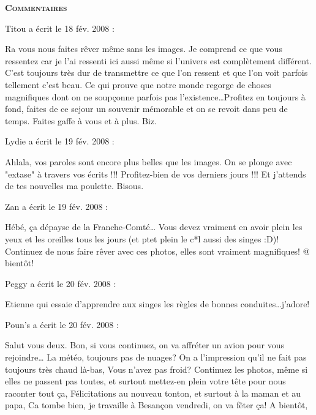 \bigskip
\textbf{\textsc{Commentaires}}

\medskip
Titou a écrit le 18 fév. 2008 :
\begin{displayquote}
Ra vous nous faites rêver même sans les images. Je comprend ce que vous ressentez car je l'ai ressenti ici aussi même si l'univers est complètement différent. C'est toujours très dur de transmettre ce que l'on ressent et que l'on voit parfois tellement c'est beau. Ce qui prouve que notre monde regorge de choses magnifiques dont on ne soupçonne parfois pas l'existence\dots Profitez en toujours à fond, faites de ce sejour un souvenir mémorable et on se revoit dans peu de temps. Faites gaffe à vous et à plus. Biz.
\end{displayquote}

\medskip
Lydie a écrit le 19 fév. 2008 :
\begin{displayquote}
Ahlala, vos paroles sont encore plus belles que les images. On se plonge avec "extase" à travers vos écrits !!!
Profitez-bien de vos derniers jours !!! Et j'attends de tes nouvelles ma poulette. Bisous.
\end{displayquote}

\medskip
Zan a écrit le 19 fév. 2008 :
\begin{displayquote}
Hébé, ça dépayse de la Franche-Comté\dots
Vous devez vraiment en avoir plein les yeux et les oreilles tous les jours (et ptet plein le c*l aussi des singes :D)!
Continuez de nous faire rêver avec ces photos, elles sont vraiment magnifiques!
@ bientôt!
\end{displayquote}

\medskip
Peggy a écrit le 20 fév. 2008 :
\begin{displayquote}
Etienne qui essaie d'apprendre aux singes les règles de bonnes conduites\dots j'adore!
\end{displayquote}

\medskip
Poun's a écrit le 20 fév. 2008 :
\begin{displayquote}
Salut vous deux. Bon, si vous continuez, on va affréter un avion pour vous rejoindre\dots
La météo, toujours pas de nuages? On a l'impression qu'il ne fait pas toujours très chaud là-bas, Vous n'avez pas froid?
Continuez les photos, même si elles ne passent pas toutes, et surtout mettez-en plein votre tête pour nous raconter tout ça,
Félicitations au nouveau tonton, et surtout à la maman et au papa,
Ca tombe bien, je travaille à Besançon vendredi, on va fêter ça!
A bientôt,
\end{displayquote}

